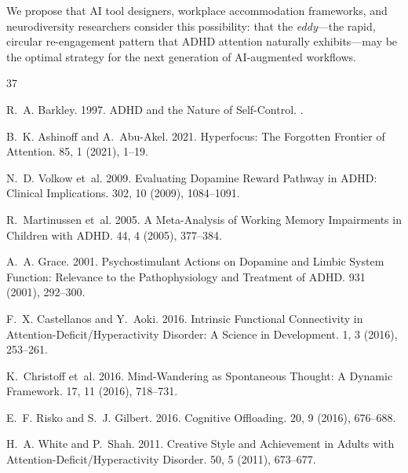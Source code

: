 \documentclass[sigconf,nonacm]{acmart}
\begin{document}
We propose that AI tool designers, workplace accommodation frameworks, and neurodiversity researchers consider this possibility: that the \emph{eddy}---the rapid, circular re-engagement pattern that ADHD attention naturally exhibits---may be the optimal strategy for the next generation of AI-augmented workflows.

\begin{thebibliography}{37}

R.~A. Barkley. 1997.
\newblock ADHD and the Nature of Self-Control.
.

B.~K. Ashinoff and A.~Abu-Akel. 2021.
\newblock Hyperfocus: The Forgotten Frontier of Attention.
 85, 1 (2021), 1--19.

N.~D. Volkow et~al. 2009.
\newblock Evaluating Dopamine Reward Pathway in ADHD: Clinical Implications.
 302, 10 (2009), 1084--1091.

R.~Martinussen et~al. 2005.
\newblock A Meta-Analysis of Working Memory Impairments in Children with ADHD.
 44, 4 (2005), 377--384.

A.~A. Grace. 2001.
\newblock Psychostimulant Actions on Dopamine and Limbic System Function: Relevance to the Pathophysiology and Treatment of ADHD.
 931 (2001), 292--300.

F.~X. Castellanos and Y.~Aoki. 2016.
\newblock Intrinsic Functional Connectivity in Attention-Deficit/Hyperactivity Disorder: A Science in Development.
 1, 3 (2016), 253--261.

K.~Christoff et~al. 2016.
\newblock Mind-Wandering as Spontaneous Thought: A Dynamic Framework.
 17, 11 (2016), 718--731.

E.~F. Risko and S.~J. Gilbert. 2016.
\newblock Cognitive Offloading.
 20, 9 (2016), 676--688.

H.~A. White and P.~Shah. 2011.
\newblock Creative Style and Achievement in Adults with Attention-Deficit/Hyperactivity Disorder.
 50, 5 (2011), 673--677.


\end{thebibliography}
\end{document}
